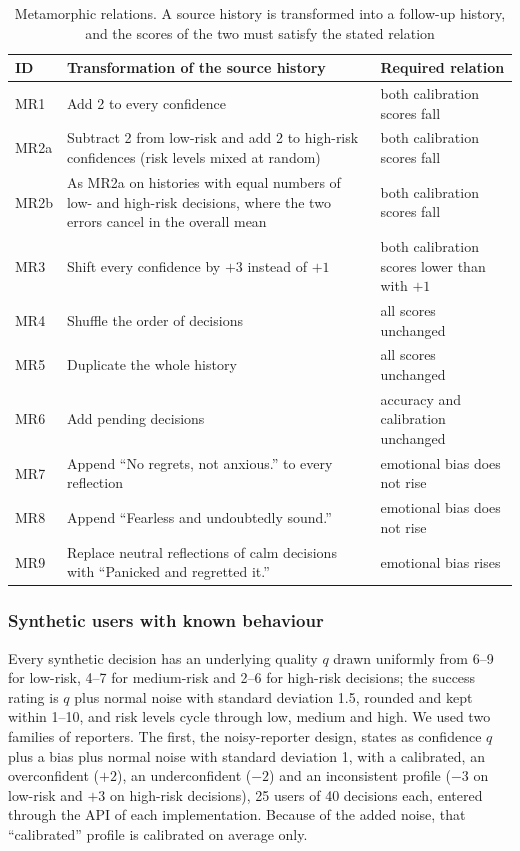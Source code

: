 \documentclass[12pt,a4paper]{article}
\newcommand{\botrule}{\bottomrule}
\newcommand{\tabnote}[1]{\par\vspace{2pt}{\footnotesize\raggedright #1\par}}
\begin{document}
\begin{table}[t]
\caption{Metamorphic relations. A source history is transformed into a follow-up history, and the scores of the two must satisfy the stated relation}\label{tab:mrdef}
\footnotesize
\begin{tabular}{@{}lL{6.2cm}L{3.6cm}@{}}
\toprule
ID & Transformation of the source history & Required relation\\
\midrule
MR1 & Add 2 to every confidence & both calibration scores fall\\
MR2a & Subtract 2 from low-risk and add 2 to high-risk confidences (risk levels mixed at random) & both calibration scores fall\\
MR2b & As MR2a on histories with equal numbers of low- and high-risk decisions, where the two errors cancel in the overall mean & both calibration scores fall\\
MR3 & Shift every confidence by $+3$ instead of $+1$ & both calibration scores lower than with $+1$\\
MR4 & Shuffle the order of decisions & all scores unchanged\\
MR5 & Duplicate the whole history & all scores unchanged\\
MR6 & Add pending decisions & accuracy and calibration unchanged\\
MR7 & Append ``No regrets, not anxious.'' to every reflection & emotional bias does not rise\\
MR8 & Append ``Fearless and undoubtedly sound.'' & emotional bias does not rise\\
MR9 & Replace neutral reflections of calm decisions with ``Panicked and regretted it.'' & emotional bias rises\\
\botrule
\end{tabular}
\tabnote{MR, metamorphic relation.}
\end{table}

\subsubsection{Synthetic users with known behaviour}\label{sec:sim}

Every synthetic decision has an underlying quality $q$ drawn uniformly from 6--9 for low-risk, 4--7 for medium-risk and 2--6 for high-risk decisions; the success rating is $q$ plus normal noise with standard deviation 1.5, rounded and kept within 1--10, and risk levels cycle through low, medium and high. We used two families of reporters. The first, the noisy-reporter design, states as confidence $q$ plus a bias plus normal noise with standard deviation 1, with a calibrated, an overconfident ($+2$), an underconfident ($-2$) and an inconsistent profile ($-3$ on low-risk and $+3$ on high-risk decisions), 25 users of 40 decisions each, entered through the API of each implementation. Because of the added noise, that ``calibrated'' profile is calibrated on average only.
\end{document}
